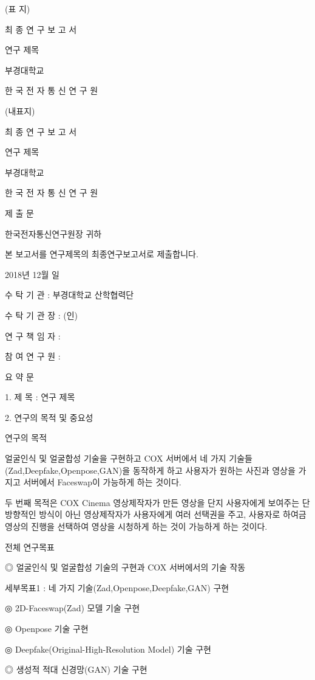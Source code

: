 \documentclass{oblivoir}
\begin{document}
\tableofcontents
\newpage

\listoffigures
\newpage

\listoftables
\newpage

(표  지)

최 종 연 구 보 고 서

연구 제목

부경대학교

한 국 전 자 통 신 연 구 원

(내표지)

최 종 연 구 보 고 서

연구 제목

부경대학교

한 국 전 자 통 신 연 구 원

제     출     문

한국전자통신연구원장  귀하

본 보고서를 연구제목의 최종연구보고서로 제출합니다. 

2018년 12월 일

수  탁  기  관 :  부경대학교 산학협력단

수 탁 기 관 장 :           (인)

연 구 책 임 자 :  

참 여 연 구 원 :  

요     약     문

1. 제   목 : 연구 제목 

2. 연구의 목적 및 중요성

연구의 목적

얼굴인식 및 얼굴합성 기술을 구현하고 COX 서버에서 네 가지 기술들(Zad,Deepfake,Openpose,GAN)을 동작하게 하고 사용자가 원하는 사진과 영상을 가지고 서버에서 Faceswap이 가능하게 하는 것이다. 

두 번째 목적은 COX Cinema 영상제작자가 만든 영상을 단지 사용자에게 보여주는 단방향적인 방식이 아닌 영상제작자가 사용자에게 여러 선택권을 주고, 사용자로 하여금 영상의 진행을 선택하여 영상을 시청하게 하는 것이 가능하게 하는 것이다. 

전체 연구목표

◎ 얼굴인식 및 얼굴합성 기술의 구현과 COX 서버에서의 기술 작동

세부목표1 : 네 가지 기술(Zad,Openpose,Deepfake,GAN) 구현

◎ 2D-Faceswap(Zad) 모델 기술 구현

◎ Openpose 기술 구현

◎ Deepfake(Original-High-Resolution Model) 기술 구현 

◎ 생성적 적대 신경망(GAN) 기술 구현 
\end{document}
